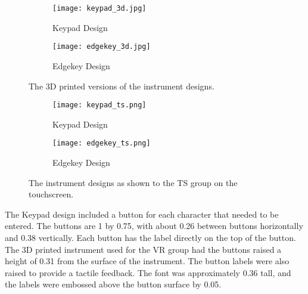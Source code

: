 \begin{figure}
    \centering
    \begin{subfigure}[t]{0.95\linewidth}
        \centering
        \texttt{[image: keypad\_3d.jpg]}
        \caption{Keypad Design}
        \label{fig:de_3d_instrument:keypad}
    \end{subfigure}
    \begin{subfigure}[t]{0.95\linewidth}
        \centering
        \texttt{[image: edgekey\_3d.jpg]}
        \caption{Edgekey Design}
        \label{fig:de_3d_instrument:edgekey}
    \end{subfigure}
    \caption{The 3D printed versions of the instrument designs.}
    \label{fig:de_3d_instrument}
\end{figure}

\begin{figure}
    \centering
    \begin{subfigure}[t]{0.95\linewidth}
        \centering
        \texttt{[image: keypad\_ts.png]}
        \caption{Keypad Design}
        \label{fig:de_ts_instrument:keypad}
    \end{subfigure}
    \begin{subfigure}[t]{0.95\linewidth}
        \centering
        \texttt{[image: edgekey\_ts.png]}
        \caption{Edgekey Design}
        \label{fig:de_ts_instrument:edgekey}
    \end{subfigure}
    \caption{The instrument designs as shown to the TS group on the touchscreen.}
    \label{fig:de_ts_instrument}
\end{figure}

The Keypad design included a button for each character that needed to be entered.
The buttons are \SI{1}{\inch} by \SI{0.75}{\inch}, with about \SI{0.26}{\inch} between buttons horizontally and \SI{0.38}{\inch} vertically.
Each button has the label directly on the top of the button.
The 3D printed instrument used for the VR group had the buttons raised a height of \SI{0.31}{\inch} from the surface of the instrument.
The button labels were also raised to provide a tactile feedback.
The font was approximately \SI{0.36}{\inch} tall, and the labels were embossed above the button surface by \SI{0.05}{\inch}.

